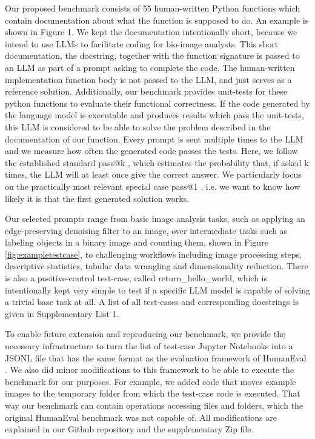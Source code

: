 \documentclass{ecai}
\begin{document}
Our proposed benchmark consists of 55 human-written Python functions which contain documentation about what the function is supposed to do. An example is shown in Figure 1. We kept the documentation intentionally short, because we intend to use LLMs to facilitate coding for bio-image analysts. This short documentation, the docstring, together with the function signature is passed to an LLM as part of a prompt asking to complete the code. The human-written implementation function body is not passed to the LLM, and just serves as a reference  solution. Additionally, our benchmark provides unit-tests for these python functions to evaluate their functional correctness. If the code generated by  the language model is executable and produces results which pass the unit-tests, this LLM is considered to be able to solve the problem described in the documentation of our function. Every prompt is sent multiple times to the LLM and we measure how often the generated  code passes the tests. Here, we follow the established standard pass@k \citep{chen2021evaluating}, which estimates the probability that, if asked k times, the LLM will at least once give the correct answer. We particularly focus on the practically most relevant special case pass@1 , i.e. we want to know how likely it is that the first generated solution works.  

Our selected prompts range from basic image analysis tasks, such as applying an edge-preserving denoising filter to an image, over intermediate tasks such as labeling objects in a binary image and counting them, shown in Figure \ref{fig:exampletestcase}, to challenging workflows including image processing steps, descriptive statistics, tabular data wrangling and dimensionality reduction. There is also a positive-control test-case, called return\_hello\_world, which is intentionally kept very simple to test if a specific LLM model is  capable of solving a trivial base task at all. A list of all test-cases and corresponding docstrings is given in Supplementary List 1.

To enable future extension and reproducing our benchmark, we provide the necessary infrastructure to turn the list of test-case Jupyter Notebooks into a JSONL file that has the same format as the evaluation framework of HumanEval \citep{chen2021evaluating}. We also did minor modifications to this framework to be able to execute the benchmark for our purposes. For example, we added code that moves example images to the temporary folder from which the test-case code is executed. That way our benchmark can contain operations accessing files and folders, which the original HumanEval benchmark was not capable of. All modifications are explained in our Github repository and the supplementary Zip file. 
\end{document}
